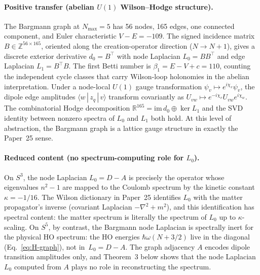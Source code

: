 \documentclass[twocolumn,pra,amsmath,amssymb,superscriptaddress]{revtex4-2}
\begin{document}
\paragraph{Positive transfer (abelian $U(1)$ Wilson--Hodge
structure).}
The Bargmann graph at $N_{\max} = 5$ has 56 nodes, 165 edges, one
connected component, and Euler characteristic $V - E = -109$.  The
signed incidence matrix $B\in\mathbb{Z}^{56\times 165}$, oriented
along the creation-operator direction ($N\to N+1$), gives a discrete
exterior derivative $d_0 = B^\top$ with node Laplacian $L_0 = BB^\top$
and edge Laplacian $L_1 = B^\top B$.  The first Betti number is
$\beta_1 = E - V + c = 110$, counting the independent cycle classes
that carry Wilson-loop holonomies in the abelian interpretation.
Under a node-local $U(1)$ gauge transformation
$\psi_v \mapsto e^{i\chi_v}\psi_v$, the dipole edge amplitudes
$\langle w\,|\,z_q\,|\,v\rangle$ transform covariantly as
$U_{vw}\mapsto e^{-i\chi_v}U_{vw}e^{i\chi_w}$.  The combinatorial
Hodge decomposition
$\mathbb{R}^{165} = \mathrm{im}\,d_0 \oplus \ker L_1$ and the
SVD identity between nonzero spectra of $L_0$ and $L_1$ both hold.
At this level of abstraction, the Bargmann graph is a lattice
gauge structure in exactly the Paper~25 sense.

\paragraph{Reduced content (no spectrum-computing role for $L_0$).}
On $S^3$, the node Laplacian $L_0 = D - A$ is precisely the operator
whose eigenvalues $n^2 - 1$ are mapped to the Coulomb spectrum by
the kinetic constant $\kappa = -1/16$.  The Wilson dictionary in
Paper~25 identifies $L_0$ with the matter propagator's inverse
(covariant Laplacian $-\nabla^2 + m^2$), and this identification has
spectral content: the matter spectrum is literally the spectrum of
$L_0$ up to $\kappa$-scaling.  On $S^5$, by contrast, the Bargmann
node Laplacian is spectrally inert for the physical HO spectrum: the
HO energies $\hbar\omega(N + 3/2)$ live in the diagonal
(Eq.~\eqref{eq:H-graph}), not in~$L_0 = D - A$.  The graph adjacency
$A$ encodes dipole transition amplitudes only, and Theorem~3 below
shows that the node Laplacian $L_0$ computed from $A$ plays no role
in reconstructing the spectrum.
\end{document}
